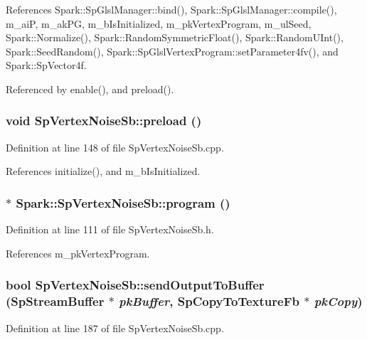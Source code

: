 References Spark::Sp\-Glsl\-Manager::bind(), Spark::Sp\-Glsl\-Manager::compile(), m\_\-ai\-P, m\_\-ak\-PG, m\_\-b\-Is\-Initialized, m\_\-pk\-Vertex\-Program, m\_\-ul\-Seed, Spark::Normalize(), Spark::Random\-Symmetric\-Float(), Spark::Random\-UInt(), Spark::Seed\-Random(), Spark::Sp\-Glsl\-Vertex\-Program::set\-Parameter4fv(), and Spark::Sp\-Vector4f.

Referenced by enable(), and preload().
\subsubsection{\setlength{\rightskip}{0pt plus 5cm}void Sp\-Vertex\-Noise\-Sb::preload ()}\label{classSpark_1_1SpVertexNoiseSb_a4}


Definition at line 148 of file Sp\-Vertex\-Noise\-Sb.cpp.

References initialize(), and m\_\-b\-Is\-Initialized.
\subsubsection{$\ast$ Spark::Sp\-Vertex\-Noise\-Sb::program ()\hspace{0.3cm}{\tt  [inline]}}\label{classSpark_1_1SpVertexNoiseSb_a14}


Definition at line 111 of file Sp\-Vertex\-Noise\-Sb.h.

References m\_\-pk\-Vertex\-Program.
\subsubsection{\setlength{\rightskip}{0pt plus 5cm}bool Sp\-Vertex\-Noise\-Sb::send\-Output\-To\-Buffer ({\bf Sp\-Stream\-Buffer} $\ast$ {\em pk\-Buffer}, {\bf Sp\-Copy\-To\-Texture\-Fb} $\ast$ {\em pk\-Copy})\hspace{0.3cm}{\tt  [virtual]}}\label{classSpark_1_1SpVertexNoiseSb_a16}


Definition at line 187 of file Sp\-Vertex\-Noise\-Sb.cpp.

